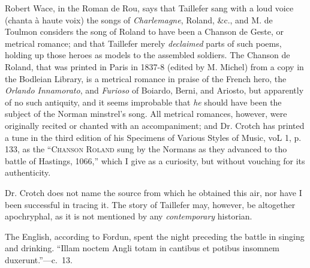 Robert Wace, in the Roman de Rou, says that Taillefer sang with a loud voice 
(chanta à haute voix) the songs of \textit{Charlemagne}, Roland, \&c., and M. de
Toulmon considers the song of Roland to have been a Chanson de Geste, or
metrical romance; and that Taillefer merely \textit{declaimed} parts of such poems, holding
up those heroes as models to the assembled soldiers. The Chanson de Roland,
that was printed in Paris in 1837-8 (edited by M. Michel) from a copy in the
Bodleian Library, is a metrical romance in praise of the French hero, the \textit{Orlando
Innamorato}, and \textit{Furioso} of Boiardo, Berni, and Ariosto, but apparently of no such
antiquity, and it seems improbable that \textit{he} should have been the subject of the
Norman minstrel's song. All metrical romances, however, were originally recited
or chanted with an accompaniment; and Dr. Crotch has printed a tune in the
third edition of his Specimens of Various Styles of Music, voL 1, p. 133, as the
“\textsc{Chanson Roland} sung by the Normans as they advanced to tho battle of
Hastings, 1066,” which I give as a curiosity, but without vouching for its
authenticity.

\noindent\begin{minipage}{\textwidth}

\end{minipage}

Dr. Crotch does not name the source from which he obtained this air, nor
have I been successful in tracing it. The story of Taillefer may, however, be
altogether apochryphal, as it is not mentioned by any \textit{contemporary} historian.

The English, according to Fordun,
\pagebreak
spent the night preceding the battle in
singing and drinking. “Illam noctem Angli totam in cantibus et potibus 
insomnem duxerunt.”—c.~13.

